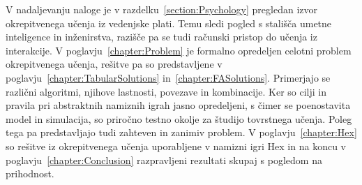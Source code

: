 \documentclass[a4paper, oneside, 12pt]{report}
\begin{document}
V nadaljevanju naloge je v razdelku~\ref{section:Psychology} pregledan izvor okrepitvenega učenja iz vedenjske plati. Temu sledi pogled s stališča umetne inteligence in inženirstva, razišče pa se tudi računski pristop do učenja iz interakcije. V poglavju~\ref{chapter:Problem} je formalno opredeljen celotni problem okrepitvenega učenja, rešitve pa so predstavljene v poglavju~\ref{chapter:TabularSolutions} in~\ref{chapter:FASolutions}. Primerjajo se različni algoritmi, njihove lastnosti, povezave in kombinacije. Ker so cilji in pravila pri abstraktnih namiznih igrah jasno opredeljeni, s čimer se poenostavita model in simulacija, so priročno testno okolje za študijo tovrstnega učenja. Poleg tega pa predstavljajo tudi zahteven in zanimiv problem.
V poglavju~\ref{chapter:Hex} so rešitve iz okrepitvenega učenja uporabljene v namizni igri Hex in na koncu v poglavju~\ref{chapter:Conclusion} razpravljeni rezultati skupaj s pogledom na prihodnost.
\end{document}
